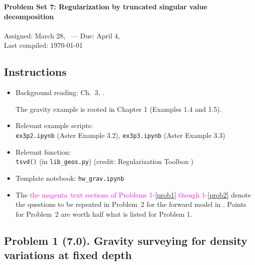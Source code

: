 \documentclass[11pt,titlepage,fleqn]{article}
\newcommand{\tfile}{{\tt hw\_grav.ipynb}}
\newcommand{\tcolor}{magenta}
\begin{document}

\begin{spacing}{1.2}
\centering
{\large \bf Problem Set 7: Regularization by truncated singular value decomposition} \\
\cltag\ \\
Assigned: March 28, \cyear\ --- Due: April 4, \cyear\ \\
Last compiled: \today
\end{spacing}


\subsection*{Instructions}

\begin{itemize}
\item Background reading: Ch.~3, \citet{Aster}.

The gravity example is rooted in Chapter 1 (Examples 1.4 and 1.5).

\item Relevant example scripts: \\ \verb+ex3p2.ipynb+ (Aster Example 3.2), \verb+ex3p3.ipynb+ (Aster Example 3.3)
\item Relevant function: \\ \verb+tsvd()+ (in \verb+lib_geos.py+) (credit: Regularization Toolbox \citep{Hansen})
\item Template notebook: \tfile\
\item The \textcolor{\tcolor}{the \tcolor\ text sections of Problems 1-\ref{prob1} though 1-\ref{prob2}} denote the questions to be repeated in Problem~2 for the forward model in . Points for Problem~2 are worth half what is listed for Problem 1.
\end{itemize}


\subsection*{Problem 1 (7.0). Gravity surveying for density variations at fixed depth}
\end{document}
